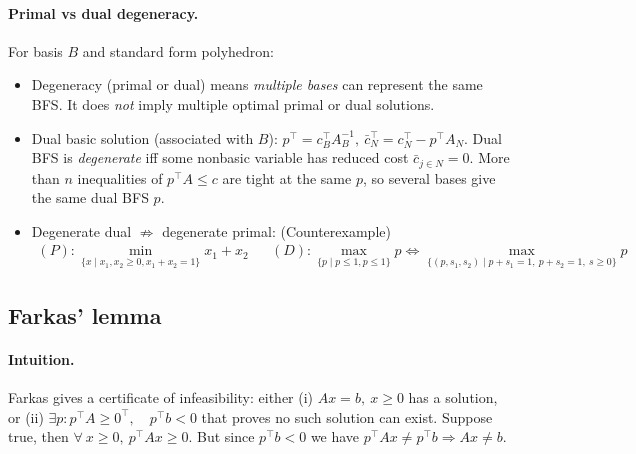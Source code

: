 \documentclass{article}
\begin{document}
\paragraph{Primal vs dual degeneracy.}
For basis $B$ and standard form polyhedron:
\begin{itemize}
    \item Degeneracy (primal or dual) means \emph{multiple bases} can represent the same BFS. It does \emph{not} imply multiple optimal primal or dual solutions.
    
    \item Dual basic solution (associated with $B$): $p^\top = c_B^\top A_B^{-1},\ \bar c_N^\top = c_N^\top - p^\top A_N$.
    Dual BFS is \emph{degenerate} iff some nonbasic variable has reduced cost $\bar c_{j\in N} = 0$.
    More than $n$ inequalities of $p^\top A \le c$ are tight at the same $p$, so several bases give the same dual BFS $p$.

    \item Degenerate dual $\not \Rightarrow$ degenerate primal: (Counterexample)
    \begin{align*}
        (P):\min_{\{x\mid x_1, x_2 \geq 0, x_1 + x_2 = 1\}}x_1 + x_2 && (D): \max_{\{p\mid p\leq 1, p\leq 1\}}p \iff \max_{\{(p, s_1, s_2)\mid p + s_1 = 1,\ p + s_2 = 1,\ s\geq 0\}}p
    \end{align*} 
\end{itemize}






\subsection{Farkas' lemma}
\paragraph{Intuition.} Farkas gives a certificate of infeasibility: either (i) $Ax=b,\ x\ge0$ has a solution, or (ii) $\exists p: p^\top A \ge 0^\top,\quad p^\top b < 0$ that proves no such solution can exist. Suppose true, then $\forall\ x \geq 0,\ p^\top Ax \geq 0$. But since $p^\top b < 0$ we have $p^\top Ax \neq p^\top b \Longrightarrow Ax \neq b$. 
\end{document}
